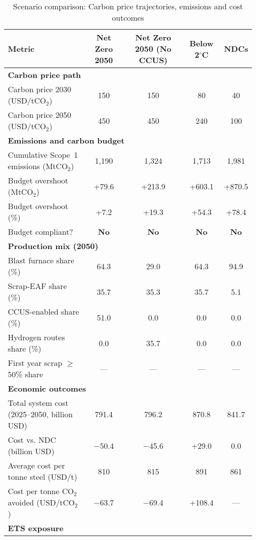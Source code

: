 \begin{table}[ht]
  \centering
  \caption{Scenario comparison: Carbon price trajectories, emissions and cost outcomes}
  \label{tab:scenario-comparison}
  \begin{threeparttable}
  \begin{tabular}{@{}lcccc@{}}
    \toprule
    Metric & Net Zero 2050 & Net Zero 2050 (No CCUS) & Below 2$^\circ$C & NDCs \\
    \midrule
    \multicolumn{4}{l}{\textbf{Carbon price path}} \\
    Carbon price 2030 (USD/tCO$_2$) & 150 & 150 & 80 & 40 \\
    Carbon price 2050 (USD/tCO$_2$) & 450 & 450 & 240 & 100 \\
    \midrule
    \multicolumn{4}{l}{\textbf{Emissions and carbon budget}} \\
    Cumulative Scope~1 emissions (MtCO$_2$) & 1{,}190 & 1{,}324 & 1{,}713 & 1{,}981 \\
    Budget overshoot (MtCO$_2$) & +79.6 & +213.9 & +603.1 & +870.5 \\
    Budget overshoot (\%) & +7.2 & +19.3 & +54.3 & +78.4 \\
    Budget compliant? & \textbf{No} & \textbf{No} & \textbf{No} & \textbf{No} \\
    \midrule
    \multicolumn{4}{l}{\textbf{Production mix (2050)}} \\
    Blast furnace share (\%) & 64.3 & 29.0 & 64.3 & 94.9 \\
    Scrap-EAF share (\%) & 35.7 & 35.3 & 35.7 & 5.1 \\
    CCUS-enabled share (\%) & 51.0 & 0.0 & 0.0 & 0.0 \\
    Hydrogen routes share (\%) & 0.0 & 35.7 & 0.0 & 0.0 \\
    First year scrap $\ge$50\% share & --- & --- & --- & --- \\
    \midrule
    \multicolumn{4}{l}{\textbf{Economic outcomes}} \\
    Total system cost (2025--2050, billion USD) & 791.4 & 796.2 & 870.8 & 841.7 \\
    Cost vs. NDC (billion USD) & $-$50.4 & $-$45.6 & +29.0 & 0.0 \\
    Average cost per tonne steel (USD/t) & 810 & 815 & 891 & 861 \\
    Cost per tonne CO$_2$ avoided (USD/tCO$_2$) & $-$63.7 & $-$69.4 & +108.4 & --- \\
    \midrule
    \multicolumn{4}{l}{\textbf{ETS exposure}} \\

\end{tabular}
\end{threeparttable}
\end{table}
